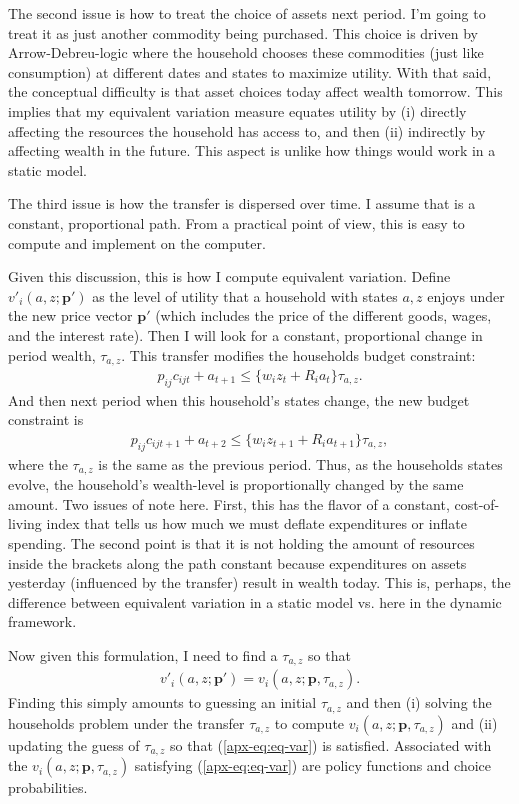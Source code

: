 \documentclass[12pt,pdftex]{article}
\begin{document}
\begin{onehalfspacing}
The second issue is how to treat the choice of assets next period. I'm going to treat it as just another commodity being purchased. This choice is driven by Arrow-Debreu-logic where the household chooses these commodities (just like consumption) at different dates and states to maximize utility. With that said, the conceptual difficulty is that asset choices today affect wealth tomorrow. This implies that my equivalent variation measure equates utility by (i) directly affecting the resources the household has access to, and then (ii) indirectly by affecting wealth in the future. This aspect is unlike how things would work in a static model.

The third issue is how the transfer is dispersed over time. I assume that is a constant, proportional path. From a practical point of view, this is easy to compute and implement on the computer.

Given this discussion, this is how I compute equivalent variation. Define $v'_i(a,z ; \mathbf{p'})$ as the level of utility that a household with states $a,z$ enjoys under the new price vector $\mathbf{p'}$ (which includes the price of the different goods, wages, and the interest rate). Then I will look for a constant, proportional change in period wealth, $\tau_{a,z}.$ This transfer modifies the households budget constraint:
\begin{align}
p_{ij}c_{ijt} + a_{t+1} \leq \bigg\{ w_{i}z_{t} + R_i a_{t} \bigg\}\tau_{a,z}.
\end{align}
And then next period when this household's states change, the new budget constraint is
\begin{align}
p_{ij}c_{ijt+1} + a_{t+2} \leq \bigg\{ w_{i}z_{t+1} + R_i a_{t+1} \bigg\}\tau_{a,z},
\end{align}
where the $\tau_{a,z}$ is the same as the previous period. Thus, as the households states evolve, the household's wealth-level is proportionally changed by the same amount. Two issues of note here. First, this has the flavor of a constant, cost-of-living index that tells us how much we must deflate expenditures or inflate spending. The second point is that it is not holding the amount of resources inside the brackets along the path constant because expenditures on assets yesterday (influenced by the transfer) result in wealth today. This is, perhaps, the difference between equivalent variation in a static model vs. here in the dynamic framework.

Now given this formulation, I need to find a $\tau_{a,z}$ so that
\begin{align}
v'_i(a,z ; \mathbf{p'}) = v_i(a,z ; \mathbf{p}, \tau_{a,z}). \label{apx-eq:eq-var}
\end{align}
Finding this simply amounts to guessing an initial $\tau_{a,z}$  and then (i) solving the households problem under the transfer $\tau_{a,z}$ to compute $v_i(a,z ; \mathbf{p}, \tau_{a,z})$ and (ii) updating the guess of $\tau_{a,z}$ so that (\ref{apx-eq:eq-var}) is satisfied. Associated with the $v_i(a,z ; \mathbf{p}, \tau_{a,z})$ satisfying (\ref{apx-eq:eq-var}) are policy functions and choice probabilities.


\end{onehalfspacing}
\end{document}
